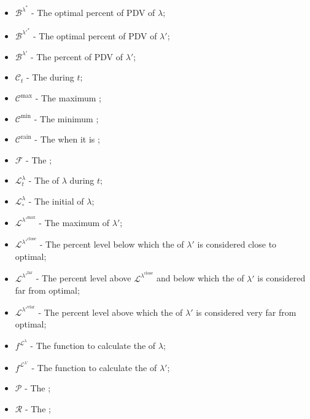 \documentclass[class=article, crop=false]{standalone}
\begin{document}
\begin{itemize}[topsep=0pt, itemsep=2pt,leftmargin=16pt]
    \item[] $\mathscr{B}^{\lambda^{*}}$ - The optimal percent of  PDV of $\lambda$;
    \item[] $\mathscr{B}^{\lambda'^{*}}$ - The optimal percent of  PDV of $\lambda'$;
    \item[] $\mathscr{B}^{\lambda'}$ - The percent of  PDV of $\lambda'$;
    \item[] $\mathscr{C}_{t}$ - The  during $t$;
    \item[] $\mathscr{C}^{\text{max}}$ - The maximum ;
    \item[] $\mathscr{C}^{\text{min}}$ - The minimum ;
    \item[] $\mathscr{C}^{\text{rain}}$ - The  when it is ;
    \item[] $\mathscr{F}$ - The ;
    \item[] $\mathscr{L}_{t}^{\lambda}$ - The  of $\lambda$ during $t$;
    \item[] $\mathscr{L}_{\circ}^{\lambda}$ - The initial  of $\lambda$;
    \item[] $\mathscr{L}^{\lambda'^{\text{max}}}$ - The maximum  of $\lambda'$;
    \item[] $\mathscr{L}^{\lambda'^{\text{close}}}$ - The percent level below which the  of $\lambda'$ is considered close to optimal;
    \item[] $\mathscr{L}^{\lambda'^{\text{far}}}$ - The percent level above $\mathscr{L}^{\lambda^{\text{close}}}$ and below which the  of $\lambda'$ is considered far from optimal;
    \item[] $\mathscr{L}^{\lambda'^{\text{vfar}}}$ - The percent level above which the  of $\lambda'$ is considered very far from optimal;
    \item[] $f^{\mathscr{L}^{\lambda}}$ - The function to calculate the  of $\lambda$;
    \item[] $f^{\mathscr{L}^{\lambda'}}$ - The function to calculate the  of $\lambda'$;
    \item[] $\mathscr{P}$ - The ;
    \item[] $\mathscr{R}$ - The ;

\end{itemize}
\end{document}
